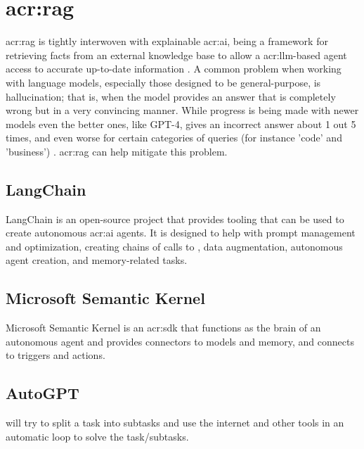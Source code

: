 \section[Retrieval Augmented Generation]{\acrlong{acr:rag}}\label{subsec:retrieval-automented-generation}

\gls{acr:rag} is tightly interwoven with explainable \acrshort{acr:ai}, being a framework for retrieving facts from an external knowledge base to allow a \acrshort{acr:llm}-based agent access to accurate up-to-date information \citep{martineauWhatRetrievalaugmentedGeneration2023}. A common problem when working with language models, especially those designed to be general-purpose, is hallucination; that is, when the model provides an answer that is completely wrong but in a very convincing manner. While progress is being made with newer models even the better ones, like GPT-4, gives an incorrect answer about 1 out 5 times, and even worse for certain categories of queries (for instance 'code' and 'business') \citep[10]{openaiGPT4TechnicalReport2023}. \acrlong{acr:rag} can help mitigate this problem.

\subsection{LangChain}\label{subsubsec:langchain}

LangChain \citep{chaseLangChain2022} is an open-source project that provides tooling that can be used to create autonomous \acrshort{acr:ai} agents. It is designed to help with prompt management and optimization, creating chains of calls to , data augmentation, autonomous agent creation, and memory-related tasks.

\subsection{Microsoft Semantic Kernel}\label{subsubsec:microsoft-semantic-kernel}

Microsoft Semantic Kernel is an \acrshort{acr:sdk} that functions as the brain of an autonomous agent and provides connectors to models and memory, and connects to triggers and actions.

\subsection{AutoGPT}\label{subsubsec:autogpt}

\cite{richardAutoGPTHeartOpensource2023} will try to split a task into subtasks and use the internet and other tools in an automatic loop to solve the task/subtasks.


\glsresetall